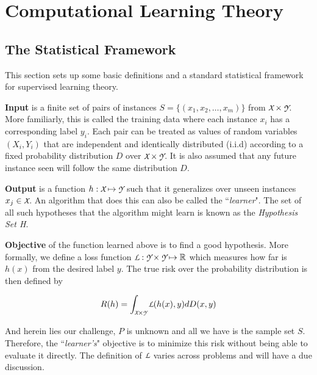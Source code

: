 \documentclass[../main]{subfiles}
\begin{document}
\chapter{Computational Learning Theory}

\section{The Statistical Framework}

This section sets up some basic definitions and a standard statistical framework for
supervised learning theory.

\textbf{Input} is a finite set of pairs of instances $S = \{(x_1,x_2,\ldots,x_m)\}$ from
$\cursive{X} \times \cursive{Y}$. More familiarly, this is called the training data where
each instance $x_i$ has a corresponding label $y_i$. Each pair can be treated as
values of random variables $(X_i,Y_i)$ that are independent and identically distributed
(i.i.d) according to a fixed probability distribution $D$ over $\cursive{X} \times 
\cursive{Y}$. It is also assumed that any future instance seen will follow the same
distribution $D$.

\textbf{Output} is a function $h: \cursive{X} \mapsto \cursive{Y}$ such that it generalizes
over unseen instances $x_j \in \cursive{X}$. An algorithm that does this can also be
called the ``\textit{learner}". The set of all such hypotheses that the algorithm might
learn is known as the \textit{Hypothesis Set H}.

\textbf{Objective} of the function learned above is to find a good hypothesis. More
formally, we define a loss function $\cursive{L}: \cursive{Y} \times \cursive{Y} \mapsto 
\mathbb{R}$ which measures how far is $h(x)$ from the desired label $y$. The true
risk over the probability distribution is then defined by

\begin{definition} \label{def:true_risk}
\begin{align}
R(h) = \int_{\cursive{X} \times \cursive{Y}} \cursive{L}(h(x),y) dD(x,y)
\end{align}
\end{definition}


And herein lies our challenge, $P$ is unknown and all we have is the sample set $S$.
Therefore, the ``\textit{learner's}" objective is to minimize this risk without being able
to evaluate it directly. The definition of $\cursive{L}$ varies across problems and will
have a due discussion.
\end{document}
